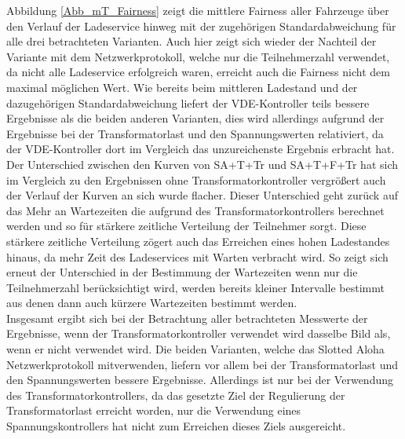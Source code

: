 Abbildung \ref{Abb_mT_Fairness} zeigt die mittlere Fairness aller Fahrzeuge über den Verlauf der Ladeservice hinweg mit der zugehörigen Standardabweichung für alle drei betrachteten Varianten. Auch hier zeigt sich wieder der Nachteil der Variante mit dem Netzwerkprotokoll, welche nur die Teilnehmerzahl verwendet, da nicht alle Ladeservice erfolgreich waren, erreicht auch die Fairness nicht dem maximal möglichen Wert. Wie bereits beim mittleren Ladestand und der dazugehörigen Standardabweichung liefert der VDE-Kontroller teils bessere Ergebnisse als die beiden anderen Varianten, dies wird allerdings aufgrund der Ergebnisse bei der Transformatorlast und den Spannungswerten relativiert, da der VDE-Kontroller dort im Vergleich das unzureichenste Ergebnis erbracht hat. Der Unterschied zwischen den Kurven von SA+T+Tr und SA+T+F+Tr hat sich im Vergleich zu den Ergebnissen ohne Transformatorkontroller vergrößert auch der Verlauf der Kurven an sich wurde flacher. Dieser Unterschied geht zurück auf das Mehr an Wartezeiten die aufgrund des Transformatorkontrollers berechnet werden und so für stärkere zeitliche Verteilung der Teilnehmer sorgt. Diese stärkere zeitliche Verteilung zögert auch das Erreichen eines hohen Ladestandes hinaus, da mehr Zeit des Ladeservices mit Warten verbracht wird. So zeigt sich erneut der Unterschied in der Bestimmung der Wartezeiten wenn nur die Teilnehmerzahl berücksichtigt wird, werden bereits kleiner Intervalle bestimmt aus denen dann auch kürzere Wartezeiten bestimmt werden.\\ 


Insgesamt ergibt sich bei der Betrachtung aller betrachteten Messwerte der Ergebnisse, wenn der Transformatorkontroller verwendet wird dasselbe Bild als, wenn er nicht verwendet wird. Die beiden Varianten, welche das Slotted Aloha Netzwerkprotokoll mitverwenden, liefern vor allem bei der Transformatorlast und den Spannungswerten bessere Ergebnisse.  Allerdings ist nur bei der Verwendung des Transformatorkontrollers, da das gesetzte Ziel der Regulierung der Transformatorlast erreicht worden, nur die Verwendung eines Spannungskontrollers hat nicht zum Erreichen dieses Ziels ausgereicht.
